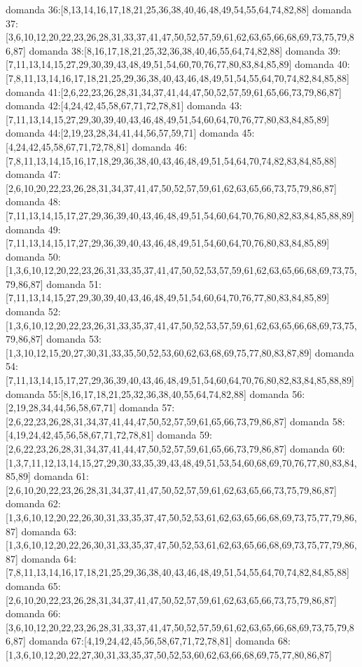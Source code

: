 domanda 36:[8,13,14,16,17,18,21,25,36,38,40,46,48,49,54,55,64,74,82,88]
domanda 37:[3,6,10,12,20,22,23,26,28,31,33,37,41,47,50,52,57,59,61,62,63,65,66,68,69,73,75,79,86,87]
domanda 38:[8,16,17,18,21,25,32,36,38,40,46,55,64,74,82,88]
domanda 39:[7,11,13,14,15,27,29,30,39,43,48,49,51,54,60,70,76,77,80,83,84,85,89]
domanda 40:[7,8,11,13,14,16,17,18,21,25,29,36,38,40,43,46,48,49,51,54,55,64,70,74,82,84,85,88]
domanda 41:[2,6,22,23,26,28,31,34,37,41,44,47,50,52,57,59,61,65,66,73,79,86,87]
domanda 42:[4,24,42,45,58,67,71,72,78,81]
domanda 43:[7,11,13,14,15,27,29,30,39,40,43,46,48,49,51,54,60,64,70,76,77,80,83,84,85,89]
domanda 44:[2,19,23,28,34,41,44,56,57,59,71]
domanda 45:[4,24,42,45,58,67,71,72,78,81]
domanda 46:[7,8,11,13,14,15,16,17,18,29,36,38,40,43,46,48,49,51,54,64,70,74,82,83,84,85,88]
domanda 47:[2,6,10,20,22,23,26,28,31,34,37,41,47,50,52,57,59,61,62,63,65,66,73,75,79,86,87]
domanda 48:[7,11,13,14,15,17,27,29,36,39,40,43,46,48,49,51,54,60,64,70,76,80,82,83,84,85,88,89]
domanda 49:[7,11,13,14,15,17,27,29,36,39,40,43,46,48,49,51,54,60,64,70,76,80,83,84,85,89]
domanda 50:[1,3,6,10,12,20,22,23,26,31,33,35,37,41,47,50,52,53,57,59,61,62,63,65,66,68,69,73,75,79,86,87]
domanda 51:[7,11,13,14,15,27,29,30,39,40,43,46,48,49,51,54,60,64,70,76,77,80,83,84,85,89]
domanda 52:[1,3,6,10,12,20,22,23,26,31,33,35,37,41,47,50,52,53,57,59,61,62,63,65,66,68,69,73,75,79,86,87]
domanda 53:[1,3,10,12,15,20,27,30,31,33,35,50,52,53,60,62,63,68,69,75,77,80,83,87,89]
domanda 54:[7,11,13,14,15,17,27,29,36,39,40,43,46,48,49,51,54,60,64,70,76,80,82,83,84,85,88,89]
domanda 55:[8,16,17,18,21,25,32,36,38,40,55,64,74,82,88]
domanda 56:[2,19,28,34,44,56,58,67,71]
domanda 57:[2,6,22,23,26,28,31,34,37,41,44,47,50,52,57,59,61,65,66,73,79,86,87]
domanda 58:[4,19,24,42,45,56,58,67,71,72,78,81]
domanda 59:[2,6,22,23,26,28,31,34,37,41,44,47,50,52,57,59,61,65,66,73,79,86,87]
domanda 60:[1,3,7,11,12,13,14,15,27,29,30,33,35,39,43,48,49,51,53,54,60,68,69,70,76,77,80,83,84,85,89]
domanda 61:[2,6,10,20,22,23,26,28,31,34,37,41,47,50,52,57,59,61,62,63,65,66,73,75,79,86,87]
domanda 62:[1,3,6,10,12,20,22,26,30,31,33,35,37,47,50,52,53,61,62,63,65,66,68,69,73,75,77,79,86,87]
domanda 63:[1,3,6,10,12,20,22,26,30,31,33,35,37,47,50,52,53,61,62,63,65,66,68,69,73,75,77,79,86,87]
domanda 64:[7,8,11,13,14,16,17,18,21,25,29,36,38,40,43,46,48,49,51,54,55,64,70,74,82,84,85,88]
domanda 65:[2,6,10,20,22,23,26,28,31,34,37,41,47,50,52,57,59,61,62,63,65,66,73,75,79,86,87]
domanda 66:[3,6,10,12,20,22,23,26,28,31,33,37,41,47,50,52,57,59,61,62,63,65,66,68,69,73,75,79,86,87]
domanda 67:[4,19,24,42,45,56,58,67,71,72,78,81]
domanda 68:[1,3,6,10,12,20,22,27,30,31,33,35,37,50,52,53,60,62,63,66,68,69,75,77,80,86,87]
